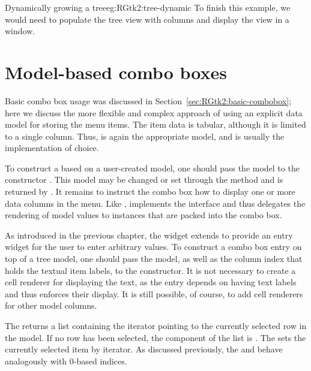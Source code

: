 \begin{example}{Dynamically growing a tree}{eg:RGtk2:tree-dynamic}
To finish this example, we would need to populate the tree view with
columns and display the view in a window.



\end{example}

\section{Model-based combo boxes}
\label{sec:RGtk2:mvc:combobox}

Basic combo box usage was discussed in
Section~\ref{sec:RGtk2:basic-combobox}; here we discuss the more
flexible and complex approach of using an explicit data model for
storing the menu items. The item data is tabular, although it is
limited to a single column. Thus,  is again the
appropriate model, and  is usually the
implementation of choice.

To construct a  based on a user-created model, one
should pass the model to the constructor
. This model may be changed or set through
the  method and is returned by
. It remains to instruct the combo box
how to display one or more data columns in the menu. Like
,  implements the
 interface and thus delegates the rendering of
model values to  instances that are packed into
the combo box.

As introduced in the previous chapter, the 
widget extends  to provide an entry widget for the
user to enter arbitrary values. To construct a combo box entry on top
of a tree model, one should pass the model, as well as the column
index that holds the textual item labels, to the
 constructor. It is not necessary to
create a cell renderer for displaying the text, as the entry depends
on having text labels and thus enforces their display. It is still
possible, of course, to add cell renderers for other model columns.

The  returns a list containing the iterator
pointing to the currently selected row in the model.  If no row has been
selected, the  component of the list is .
The  sets the currently selected
item by iterator. As discussed previously, the
 and 
behave analogously with $0$-based indices.

